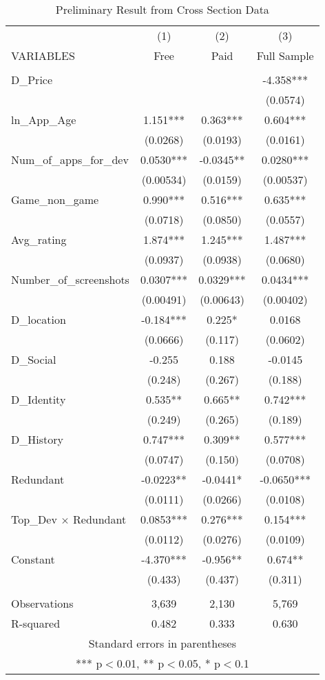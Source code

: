\documentclass[12pt]{article}
\begin{document}
\begin{footnotesize}
	\renewcommand{\arraystretch}{0.9}
	\begin{table}[htbp]\centering \caption{Preliminary Result from Cross Section Data \label{Results1}}
		\begin{tabular}{lccc} \hline
			& (1) & (2) & (3) \\
			VARIABLES & Free & Paid & Full Sample \\ \hline
			&  &  &  \\
			D\_Price &  &  & -4.358*** \\
			&  &  & (0.0574) \\
			ln\_App\_Age & 1.151*** & 0.363*** & 0.604*** \\
			& (0.0268) & (0.0193) & (0.0161) \\
			Num\_of\_apps\_for\_dev & 0.0530*** & -0.0345** & 0.0280*** \\
			& (0.00534) & (0.0159) & (0.00537) \\ 
			Game\_non\_game & 0.990*** & 0.516*** & 0.635*** \\
			& (0.0718) & (0.0850) & (0.0557) \\
			Avg\_rating & 1.874*** & 1.245*** & 1.487*** \\
			& (0.0937) & (0.0938) & (0.0680) \\
			Number\_of\_screenshots & 0.0307*** & 0.0329*** & 0.0434*** \\
			& (0.00491) & (0.00643) & (0.00402) \\
			D\_location & -0.184*** & 0.225* & 0.0168 \\
			& (0.0666) & (0.117) & (0.0602) \\
			D\_Social & -0.255 & 0.188 & -0.0145 \\
			& (0.248) & (0.267) & (0.188) \\
			D\_Identity & 0.535** & 0.665** & 0.742*** \\
			& (0.249) & (0.265) & (0.189) \\
			D\_History & 0.747*** & 0.309** & 0.577*** \\
			& (0.0747) & (0.150) & (0.0708) \\
			Redundant & -0.0223** & -0.0441* & -0.0650*** \\
			& (0.0111) & (0.0266) & (0.0108) \\
			Top\_Dev $\times$ Redundant & 0.0853*** & 0.276*** & 0.154*** \\
			& (0.0112) & (0.0276) & (0.0109) \\
			Constant & -4.370*** & -0.956** & 0.674** \\
			& (0.433) & (0.437) & (0.311) \\
			&  &  &  \\
			Observations & 3,639 & 2,130 & 5,769 \\
			R-squared & 0.482 & 0.333 & 0.630 \\ \hline
			\multicolumn{4}{c}{ Standard errors in parentheses} \\
			\multicolumn{4}{c}{ *** p$<$0.01, ** p$<$0.05, * p$<$0.1} \\
\end{tabular}\end{table}\end{footnotesize}
\end{document}

